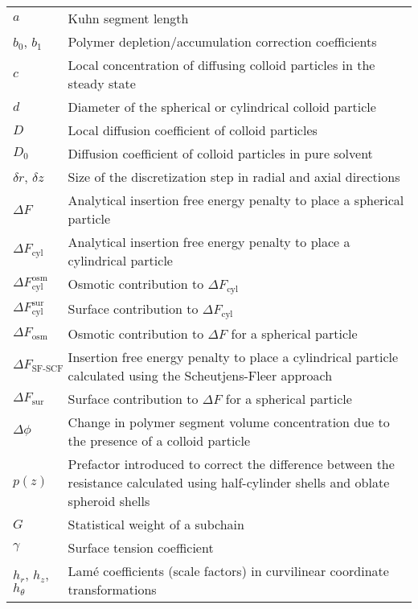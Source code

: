 \documentclass[10pt, a4paper, twocolumn]{article}
\begin{document}
%
\begin{tabularx}{\linewidth}{l X}
    $a$ & Kuhn segment length \\
    $b_0$, $b_1$ & Polymer depletion/accumulation correction coefficients \\
    $c$ & Local concentration of diffusing colloid particles in the steady state \\
    $d$ & Diameter of the spherical or cylindrical colloid particle \\
    $D$ & Local diffusion coefficient of colloid particles \\
    $D_0$ & Diffusion coefficient of colloid particles in pure solvent \\
    $\delta r$, $\delta z$ & Size of the discretization step in radial and axial directions \\
    $\Delta F$ & Analytical insertion free energy penalty to place a spherical particle \\
    $\Delta F_{\text{cyl}}$ & Analytical insertion free energy penalty to place a cylindrical particle \\
    $\Delta F_{\text{cyl}}^{\text{osm}}$ & Osmotic contribution to $\Delta F_{\text{cyl}}$ \\
    $\Delta F_{\text{cyl}}^{\text{sur}}$ & Surface contribution to $\Delta F_{\text{cyl}}$ \\
    $\Delta F_{\text{osm}}$ & Osmotic contribution to $\Delta F$ for a spherical particle\\
    $\Delta F_{\text{SF-SCF}}$ & Insertion free energy penalty to place a cylindrical particle calculated using the Scheutjens-Fleer approach \\
    $\Delta F_{\text{sur}}$ & Surface contribution to $\Delta F$ for a spherical particle\\
    $\Delta \phi$ & Change in polymer segment volume concentration due to the presence of a colloid particle \\
    $p(z)$ & Prefactor introduced to correct the difference between the resistance calculated using half-cylinder shells and oblate spheroid shells \\
    $G$ & Statistical weight of a subchain \\
    $\gamma$ & Surface tension coefficient \\
    $h_{r}$, $h_{z}$, $h_{\theta}$ & Lam\'e coefficients (scale factors) in curvilinear coordinate transformations \\

\end{tabularx}
\end{document}
